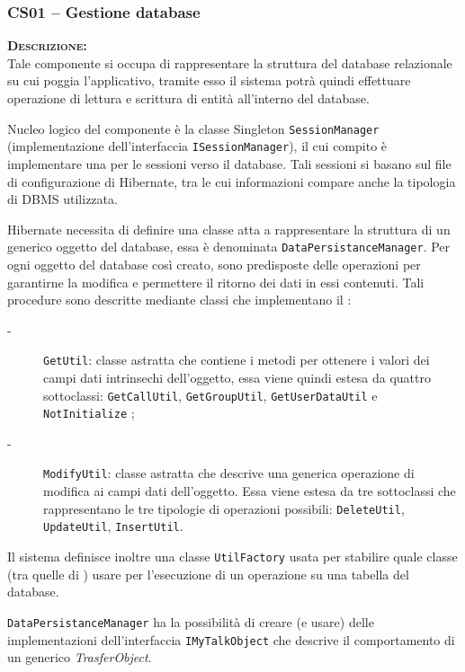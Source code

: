 \subsubsection{CS01 -- Gestione database}\label{sec:cs01}
\begin{description}
\item{\scshape\bfseries Descrizione:}\\
Tale componente si occupa di rappresentare la struttura del database relazionale su cui poggia l'applicativo, tramite esso il sistema potrà quindi effettuare operazione di lettura e scrittura di entità all'interno del database.

Nucleo logico del componente è la classe Singleton \texttt{SessionManager} (implementazione dell'interfaccia \texttt{ISessionManager}), il cui compito è implementare una  per le sessioni verso il database. Tali sessioni si basano sul file di configurazione di Hibernate, tra le cui informazioni compare anche la tipologia di DBMS utilizzata.

Hibernate necessita di definire una classe atta a rappresentare la struttura di un generico oggetto del database, essa è denominata \texttt{DataPersistanceManager}.
Per ogni oggetto del database così creato, sono predisposte delle operazioni per garantirne la modifica e permettere il ritorno dei dati in essi contenuti. Tali procedure sono descritte mediante  classi che implementano il  :

\begin{description}
\item[-] \texttt{GetUtil}: classe astratta che contiene i metodi per ottenere i valori dei campi dati intrinsechi dell'oggetto, essa viene quindi estesa da quattro sottoclassi: \texttt{GetCallUtil}, \texttt{GetGroupUtil}, \texttt{GetUserDataUtil} e \texttt{NotInitialize} ;
\item[-] \texttt{ModifyUtil}: classe astratta che descrive una generica operazione di modifica ai campi dati dell'oggetto. Essa viene estesa da tre sottoclassi che rappresentano le tre tipologie di operazioni possibili: \texttt{DeleteUtil}, \texttt{UpdateUtil}, \texttt{InsertUtil}.
\end{description}

Il sistema definisce inoltre una classe \texttt{UtilFactory} usata per stabilire quale classe (tra quelle di ) usare per l'esecuzione di un operazione su una tabella del database.

\texttt{DataPersistanceManager} ha la possibilità di creare (e usare) delle implementazioni dell'interfaccia \texttt{IMyTalkObject} che descrive il comportamento di un generico \textit{TrasferObject}.



\end{description}
